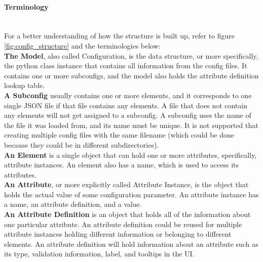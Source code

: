 \paragraph{Terminology}\mbox{}\\
For a better understanding of how the structure is built up, refer to figure \ref{fig:config_structure} and the terminologies below:\\

\textbf{The Model}, also called
Configuration, is the data structure, or more specifically, the python class instance that contains all information from the config files. It contains one or more subconfigs, and the model also holds the attribute definition lookup table.\\

\textbf{A Subconfig} usually contains one or more elements, and it corresponds to one single \ac{JSON} file if that file contains any elements. A file that does not contain any elements will not get assigned to a subconfig.  A subconfig uses the name of the file it was loaded from, and its name must be unique. It is not supported that creating multiple config files with the same filename (which could be done because they could be in different subdirectories).\\

\textbf{An Element} is a single object that can hold one or more attributes, specifically, attribute instances. An element also has a name, which is used to access its attributes.\\

\textbf{An Attribute}, or more explicitly called Attribute  Instance,  is
the object that holds the actual value of some configuration parameter. An attribute instance has a name, an attribute definition, and a value.\\

\textbf{An Attribute Definition} is an object that holds all of the information about one particular attribute. An attribute definition could be reused for multiple attribute instances holding different information or belonging to different elements. An attribute definition will hold information about an attribute such as its type, validation information, label, and tooltips in the UI.\\



